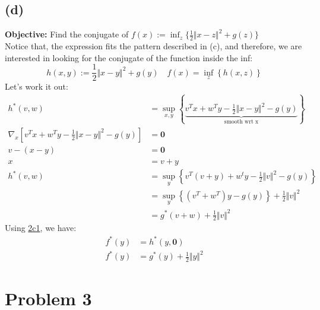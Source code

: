 \documentclass[]{article}
\begin{document}
    \subsection*{(d)}
        \textbf{Objective: }Find the conjugate of $f(x):= \inf_z \{
            \frac{1}{2}\Vert x - z\Vert^2 + g(z)
        \}$
        \\
        Notice that, the expression fits the pattern described in (c), and therefore, we are interested in looking for the conjugate of the function inside the inf: 
        $$
        h(x, y) := \frac{1}{2} \Vert x - y\Vert^2 + g(y) \quad f(x) = \inf_z \left\lbrace
            h(x, z)
        \right\rbrace
        $$
        Let's work it out: 
        \begin{align*}\tag{2d1}\label{eqn:2d1}
            h^*(v, w) &= \sup_{x, y} \left\lbrace
                \underbrace{v^Tx + w^Ty - \frac{1}{2}\Vert x - y\Vert^2 - g(y)}_\text{smooth wrt x}
            \right\rbrace
            \\
            \nabla_x \left[ 
                v^Tx + w^Ty - \frac{1}{2}\Vert x - y\Vert^2 - g(y)
            \right] &= \mathbf{0}
            \\
            v - (x - y) &= \mathbf{0}
            \\
            x &= v + y
            \\
            h^*(v, w) &= \sup_y \left\lbrace
                v^T(v + y) + w^t y - \frac{1}{2} \Vert v\Vert^2 - g(y)
            \right\rbrace
            \\
            &=
            \sup_y \left\lbrace
                (v^T + w^T)y - g(y)
            \right\rbrace + \frac{1}{2}\Vert v \Vert^2
            \\
            &= g^*(v + w) + \frac{1}{2} \Vert v\Vert^2
        \end{align*}
        Using \hyperref[eqn:2c1]{2c1}, we have: 
        \begin{align*}\tag{2d2}\label{eqn:2d2}
            f^*(y) &= h^*(y, \mathbf{0}) 
            \\
            f^*(y) &= g^*(y) + \frac{1}{2}\Vert y\Vert^2
        \end{align*}
\section*{Problem 3}
\end{document}
